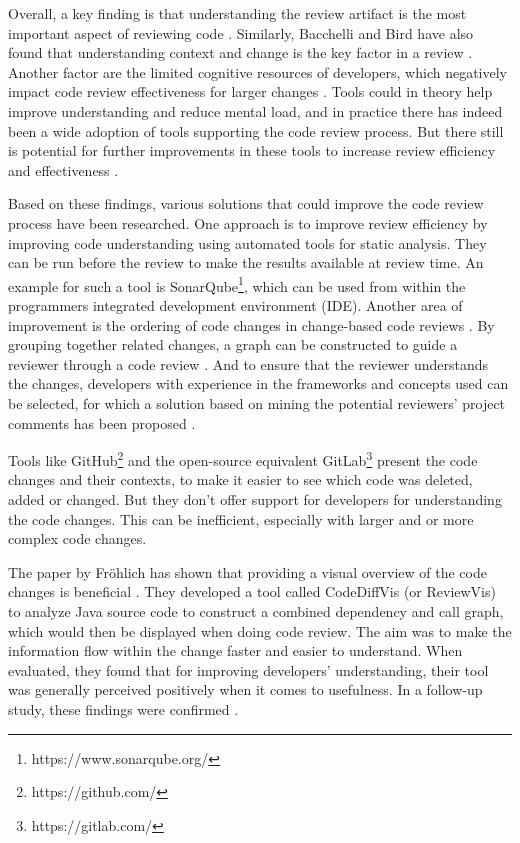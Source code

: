 \documentclass[a4paper,11pt,twoside]{article}
\theoremstyle{definition} %
\renewcommand{\cite}[1]{\citep{#1}}
\begin{document}
Overall, a key finding is that understanding the review artifact is the most important aspect of reviewing code \citep{baum2016need, McIntosh-2016}. Similarly, Bacchelli and Bird have also found that understanding context and change is the key factor in a review \cite{6606617}. Another factor are the limited cognitive resources of developers, which negatively impact code review effectiveness for larger changes \cite{Baum2019}. Tools could in theory help improve understanding and reduce mental load, and in practice there has indeed been a wide adoption of tools supporting the code review process. But there still is potential for further improvements in these tools to increase review efficiency and effectiveness \cite{baum2016need}. 

Based on these findings, various solutions that could improve the code review process have been researched. One approach is to improve review efficiency by improving code understanding using automated tools for static analysis. They can be run before the review to make the results available at review time. An example for such a tool is SonarQube\footnote{https://www.sonarqube.org/}, which can be used from within the programmers integrated development environment (IDE). Another area of improvement is the ordering of code changes in change-based code reviews \cite{baum2016need}. By grouping together related changes, a graph can be constructed to guide a reviewer through a code review \cite{baum2017optimal}. And to ensure that the reviewer understands the changes, developers with experience in the frameworks and concepts used can be selected, for which a solution based on mining the potential reviewers' project comments has been proposed \cite{DBLP:journals/corr/abs-1906-07108}. 

Tools like GitHub\footnote{https://github.com/} and the open-source equivalent GitLab\footnote{https://gitlab.com/} present the code changes and their contexts, to make it easier to see which code was deleted, added or changed. But they don’t offer support for developers for understanding the code changes. This can be inefficient, especially with larger and or more complex code changes. 

The paper by Fröhlich has shown that providing a visual overview of the code changes is beneficial \cite{publication-20661}. They developed a tool called CodeDiffVis (or ReviewVis) to analyze Java source code to construct a combined dependency and call graph, which would then be displayed when doing code review. The aim was to make the information flow within the change faster and easier to understand. When evaluated, they found that for improving developers’ understanding, their tool was generally perceived positively when it comes to usefulness. In a follow-up study, these findings were confirmed \cite{cr_visualization_major}.
\end{document}
